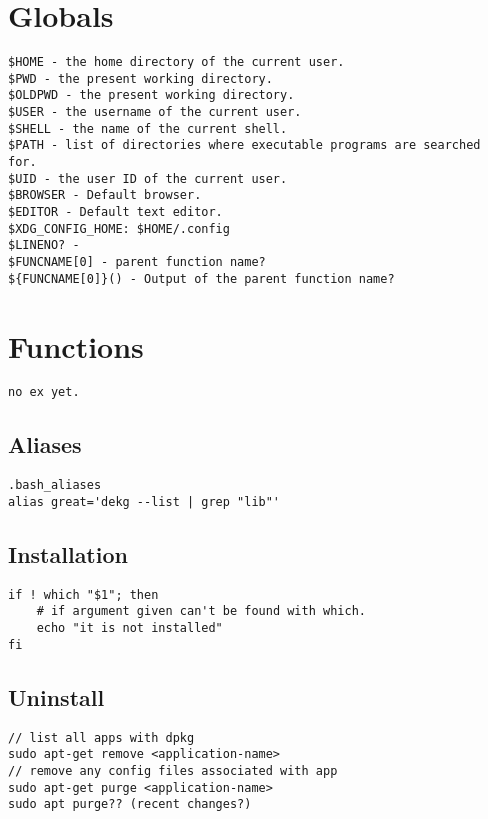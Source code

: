 \section{Globals}

\begin{verbatim}
$HOME - the home directory of the current user.
$PWD - the present working directory.
$OLDPWD - the present working directory.
$USER - the username of the current user.
$SHELL - the name of the current shell.
$PATH - list of directories where executable programs are searched for.
$UID - the user ID of the current user.
$BROWSER - Default browser.
$EDITOR - Default text editor.
$XDG_CONFIG_HOME: $HOME/.config
$LINENO? -
$FUNCNAME[0] - parent function name?
${FUNCNAME[0]}() - Output of the parent function name?
\end{verbatim}

\section{Functions}

\begin{verbatim}
no ex yet.
\end{verbatim}

\subsection{Aliases}

\begin{verbatim}
.bash_aliases
alias great='dekg --list | grep "lib"'
\end{verbatim}

\subsection{Installation}

\begin{verbatim}
if ! which "$1"; then
    # if argument given can't be found with which. 
    echo "it is not installed"
fi
\end{verbatim}

\subsection{Uninstall}

\begin{verbatim}
// list all apps with dpkg
sudo apt-get remove <application-name>
// remove any config files associated with app
sudo apt-get purge <application-name>
sudo apt purge?? (recent changes?) 
\end{verbatim}

